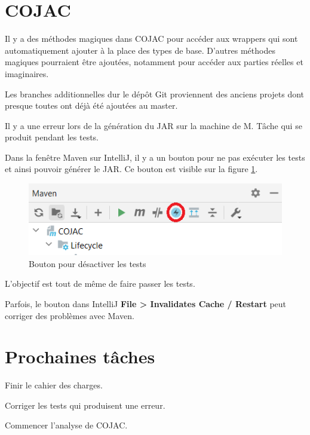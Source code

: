 \documentclass[11pt]{meetingmins}
\begin{document}
\section{COJAC}
\begin{hiddenitems}
    \item Il y a des méthodes magiques dans COJAC pour accéder aux wrappers qui sont automatiquement ajouter à la place des types de base. D'autres méthodes magiques pourraient être ajoutées, notamment pour accéder aux parties réelles et imaginaires.
    \item Les branches additionnelles dur le dépôt Git proviennent des anciens projets dont presque toutes ont déjà été ajoutées au master.
    \item Il y a une erreur lors de la génération du JAR sur la machine de M. Tâche qui se produit pendant les tests.
    \item Dans la fenêtre Maven sur IntelliJ, il y a un bouton pour ne pas exécuter les tests et ainsi pouvoir générer le JAR. Ce bouton est visible sur la figure \ref{fig:skip_button}.
    \begin{figure}[ht]
        \centering
        \includegraphics{skip_test_button.png}
        \caption{Bouton pour désactiver les tests}
        \label{fig:skip_button}
    \end{figure}
    \item L'objectif est tout de même de faire passer les tests.
    \item Parfois, le bouton dans IntelliJ \textbf{File > Invalidates Cache / Restart} peut corriger des problèmes avec Maven.
\end{hiddenitems}

\section{Prochaines tâches}
\begin{hiddenitems}
    \item Finir le cahier des charges.
    \item Corriger les tests qui produisent une erreur.
    \item Commencer l'analyse de COJAC.
\end{hiddenitems}
\end{document}
